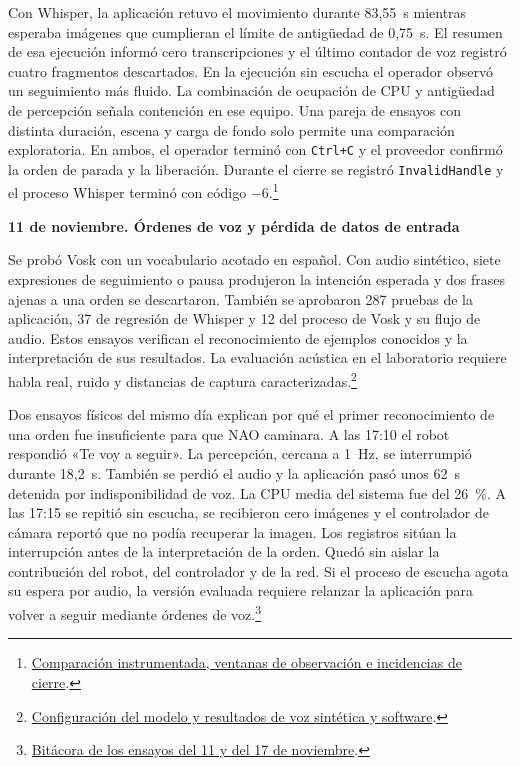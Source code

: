 \documentclass[11pt,letterpaper]{article}
\newcommand{\code}[1]{\nolinkurl{#1}}
\begin{document}
Con Whisper, la aplicación retuvo el movimiento durante 83,55~s mientras esperaba imágenes que cumplieran el límite de antigüedad de 0,75~s. El resumen de esa ejecución informó cero transcripciones y el último contador de voz registró cuatro fragmentos descartados. En la ejecución sin escucha el operador observó un seguimiento más fluido. La combinación de ocupación de CPU y antigüedad de percepción señala contención en ese equipo. Una pareja de ensayos con distinta duración, escena y carga de fondo solo permite una comparación exploratoria. En ambos, el operador terminó con \code{Ctrl+C} y el proveedor confirmó la orden de parada y la liberación. Durante el cierre se registró \code{InvalidHandle} y el proceso Whisper terminó con código $-6$.\footnote{\href{https://github.com/jumafe1/portable-hri-reference-system/blob/eb3c5d1/results/follow_whisper_comparison_20261104.json}{Comparación instrumentada, ventanas de observación e incidencias de cierre}.}

\par\medskip\noindent\textbf{11 de noviembre. Órdenes de voz y pérdida de datos de entrada}\par

Se probó Vosk con un vocabulario acotado en español. Con audio sintético, siete expresiones de seguimiento o pausa produjeron la intención esperada y dos frases ajenas a una orden se descartaron. También se aprobaron 287 pruebas de la aplicación, 37 de regresión de Whisper y 12 del proceso de Vosk y su flujo de audio. Estos ensayos verifican el reconocimiento de ejemplos conocidos y la interpretación de sus resultados. La evaluación acústica en el laboratorio requiere habla real, ruido y distancias de captura caracterizadas.\footnote{\href{https://github.com/jumafe1/portable-hri-reference-system/blob/910c05f/results/vosk_voice_commands_20261111.json}{Configuración del modelo y resultados de voz sintética y software}.}

Dos ensayos físicos del mismo día explican por qué el primer reconocimiento de una orden fue insuficiente para que NAO caminara. A las 17:10 el robot respondió «Te voy a seguir». La percepción, cercana a 1~Hz, se interrumpió durante 18,2~s. También se perdió el audio y la aplicación pasó unos 62~s detenida por indisponibilidad de voz. La CPU media del sistema fue del 26~\%. A las 17:15 se repitió sin escucha, se recibieron cero imágenes y el controlador de cámara reportó que no podía recuperar la imagen. Los registros sitúan la interrupción antes de la interpretación de la orden. Quedó sin aislar la contribución del robot, del controlador y de la red. Si el proceso de escucha agota su espera por audio, la versión evaluada requiere relanzar la aplicación para volver a seguir mediante órdenes de voz.\footnote{\href{https://github.com/jumafe1/portable-hri-docs/commit/95d141f}{Bitácora de los ensayos del 11 y del 17 de noviembre}.}
\end{document}

